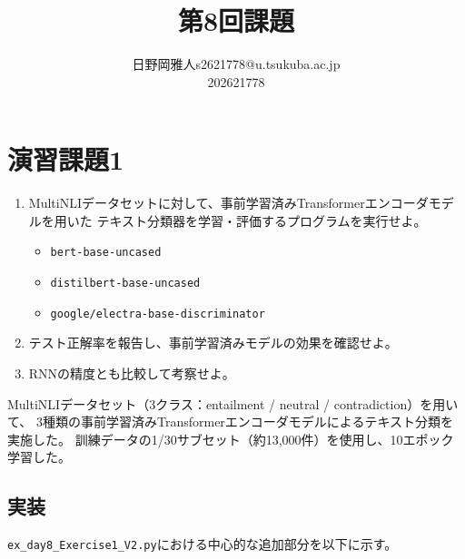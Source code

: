 \documentclass[twoside,11pt]{article}
\makeatletter
\newcommand\assignmentNumber{8}                             %
\newcommand\studentName{日野岡雅人}                  %
\newcommand\studentEmail{s2621778@u.tsukuba.ac.jp}          %
\newcommand\studentNumber{202621778}                %
\makeatother
\begin{document}
    
    \title{第\assignmentNumber 回課題}
    
    \author{\name \studentName \email \studentEmail \\
    \studentNumber
    \addr
    }

    
    \maketitle

\section{演習課題1}
\begin{enumerate}
    \item MultiNLIデータセットに対して、事前学習済みTransformerエンコーダモデルを用いた
    テキスト分類器を学習・評価するプログラムを実行せよ。
    \begin{itemize}
        \item \texttt{bert-base-uncased}
        \item \texttt{distilbert-base-uncased}
        \item \texttt{google/electra-base-discriminator}
    \end{itemize}
    \item テスト正解率を報告し、事前学習済みモデルの効果を確認せよ。
    \item RNNの精度とも比較して考察せよ。
\end{enumerate}

MultiNLIデータセット（3クラス：entailment / neutral / contradiction）を用いて、
3種類の事前学習済みTransformerエンコーダモデルによるテキスト分類を実施した。
訓練データの1/30サブセット（約13,000件）を使用し、10エポック学習した。

\subsection*{実装}

\texttt{ex\_day8\_Exercise1\_V2.py}における中心的な追加部分を以下に示す。
\end{document}
